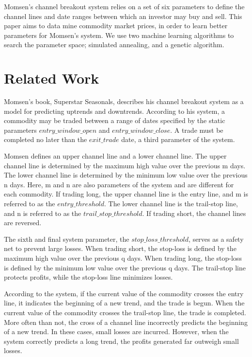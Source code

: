 \documentclass[12pt]{article}
\begin{document}
Momsen's channel breakout system relies on a set of six parameters to define
the channel lines and date ranges between which an investor may buy and sell.
This paper aims to data mine commodity market prices, in order to learn better
parameters for Momsen's system. We use two machine learning algorithms to
search the parameter space; simulated annealing, and a genetic algorithm.

\vspace{-15pt}

\section{Related Work}

\vspace{-5pt}

Momsen's book, Superstar Seasonals, describes his channel breakout system as a
model for predicting uptrends and downtrends.  According to his system, a
commodity may be traded between a range of dates specified by the static
parameters $entry\_window\_open$ and $entry\_window\_close$.  A trade must be
completed no later than the $exit\_trade$ date, a third parameter of the
system.

Momsen defines an upper channel line and a lower channel line.  The upper
channel line is determined by the maximum high value over the previous m days.
The lower channel line is determined by the minimum low value over the previous
n days.  Here, m and n are also parameters of the system and are different for
each commodity.  If trading long, the upper channel line is the entry line, and
m is referred to as the $entry\_threshold$. The lower channel line is the
trail-stop line, and n is referred to as the $trail\_stop\_threshold$.  If
trading short, the channel lines are reversed.

The sixth and final system parameter, the $stop\_loss\_threshold$, serves as a
safety net to prevent large losses.  When trading short, the stop-loss is
defined by the maximum high value over the previous q days.  When trading long,
the stop-loss is defined by the minimum low value over the previous q days.  The
trail-stop line protects profits, while the stop-loss line minimizes losses.

According to the system, if the current value of the commodity crosses the entry
line, it indicates the beginning of a new trend, and the trade is begun.  When
the current value of the commodity crosses the trail-stop line, the trade is
completed.  More often than not, the cross of a channel line incorrectly
predicts the beginning of a new trend.  In these cases, small losses are incurred.
However, when the system correctly predicts a long trend, the profits generated
far outweigh small losses.
\end{document}
